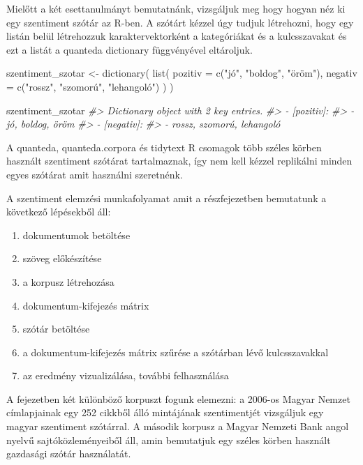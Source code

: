 \documentclass[
]{book}
\newenvironment{Shaded}{\begin{snugshade}}{\end{snugshade}}
\newcommand{\AttributeTok}[1]{\textcolor[rgb]{0.77,0.63,0.00}{#1}}
\newcommand{\CommentTok}[1]{\textcolor[rgb]{0.56,0.35,0.01}{\textit{#1}}}
\newcommand{\FunctionTok}[1]{\textcolor[rgb]{0.00,0.00,0.00}{#1}}
\newcommand{\NormalTok}[1]{#1}
\newcommand{\OtherTok}[1]{\textcolor[rgb]{0.56,0.35,0.01}{#1}}
\newcommand{\StringTok}[1]{\textcolor[rgb]{0.31,0.60,0.02}{#1}}
\providecommand{\tightlist}{%
  \setlength{\itemsep}{0pt}\setlength{\parskip}{0pt}}
\begin{document}
Mielőtt a két esettanulmányt bemutatnánk, vizsgáljuk meg hogy hogyan néz
ki egy szentiment szótár az R-ben. A szótárt kézzel úgy tudjuk
létrehozni, hogy egy listán belül létrehozzuk karaktervektorként a
kategóriákat és a kulcsszavakat és ezt a listát a quanteda dictionary
függvényével eltároljuk.

\begin{Shaded}
\begin{Highlighting}[]
\NormalTok{szentiment\_szotar }\OtherTok{\textless{}{-}} \FunctionTok{dictionary}\NormalTok{(}
  \FunctionTok{list}\NormalTok{(}
    \AttributeTok{pozitiv =} \FunctionTok{c}\NormalTok{(}\StringTok{"jó"}\NormalTok{, }\StringTok{"boldog"}\NormalTok{, }\StringTok{"öröm"}\NormalTok{),}
    \AttributeTok{negativ =} \FunctionTok{c}\NormalTok{(}\StringTok{"rossz"}\NormalTok{, }\StringTok{"szomorú"}\NormalTok{, }\StringTok{"lehangoló"}\NormalTok{)}
\NormalTok{    )}
\NormalTok{  )}

\NormalTok{szentiment\_szotar}
\CommentTok{\#\textgreater{} Dictionary object with 2 key entries.}
\CommentTok{\#\textgreater{} {-} [pozitiv]:}
\CommentTok{\#\textgreater{}   {-} jó, boldog, öröm}
\CommentTok{\#\textgreater{} {-} [negativ]:}
\CommentTok{\#\textgreater{}   {-} rossz, szomorú, lehangoló}
\end{Highlighting}
\end{Shaded}

A quanteda, quanteda.corpora és tidytext R csomagok több széles körben
használt szentiment szótárat tartalmaznak, így nem kell kézzel
replikálni minden egyes szótárat amit használni szeretnénk.

A szentiment elemzési munkafolyamat amit a részfejezetben bemutatunk a
következő lépésekből áll:

\begin{enumerate}
\def\labelenumi{\arabic{enumi}.}
\tightlist
\item
  dokumentumok betöltése
\item
  szöveg előkészítése
\item
  a korpusz létrehozása
\item
  dokumentum-kifejezés mátrix
\item
  szótár betöltése
\item
  a dokumentum-kifejezés mátrix szűrése a szótárban lévő kulcsszavakkal
\item
  az eredmény vizualizálása, további felhasználása
\end{enumerate}

A fejezetben két különböző korpuszt fogunk elemezni: a 2006-os Magyar
Nemzet címlapjainak egy 252 cikkből álló mintájának szentimentjét
vizsgáljuk egy magyar szentiment szótárral. A második korpusz a Magyar
Nemzeti Bank angol nyelvű sajtóközleményeiből áll, amin bemutatjuk egy
széles körben használt gazdasági szótár használatát.
\end{document}
